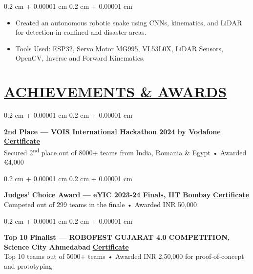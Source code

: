 \documentclass[10pt, letterpaper]{article}
\newenvironment{highlights}{
    \begin{itemize}[
        topsep=0.05 cm,
        parsep=0 cm,
        partopsep=0pt,
        itemsep=0pt,
        leftmargin=0.4 cm + 10pt
    ]
}{
    \end{itemize}
} %
\newenvironment{onecolentry}{
    \begin{adjustwidth}{
        0.2 cm + 0.00001 cm
    }{
        0.2 cm + 0.00001 cm
    }
}{
    \end{adjustwidth}
} %
\begin{document}
\vspace{0.10 cm}
\begin{onecolentry}
    \begin{highlights}
        \item Created an autonomous robotic snake using CNNs, kinematics, and LiDAR for detection in confined and disaster areas.
        \item Tools Used: ESP32, Servo Motor MG995, VL53L0X, LiDAR Sensors, OpenCV, Inverse and Forward Kinematics.
    \end{highlights}
\end{onecolentry}
         

        \section{\href{https://www.harjot.info/\#Achievements}{ACHIEVEMENTS \& AWARDS}}

\begin{onecolentry}
    \textbf{2nd Place --- VOIS International Hackathon 2024 by Vodafone} \hfill
    \href{https://drive.google.com/drive/folders/1iAM-mW90riDdtIffdLflbHKzxa-PJVyi?usp=sharing}{\textbf{Certificate}} \\
    \quad Secured 2\textsuperscript{nd} place out of 8000+ teams from India, Romania \& Egypt • Awarded €4,000
\end{onecolentry}

\vspace{0.04cm}

\begin{onecolentry}
    \textbf{Judges' Choice Award --- eYIC 2023-24 Finals, IIT Bombay} \hfill
    \href{https://drive.google.com/file/d/1oG1jKMsQmqKw4ZLALATirmeHcBpnrcL3/view?usp=sharing}{\textbf{Certificate}} \\
    \quad Competed out of 299 teams in the finale  • Awarded INR 50,000
\end{onecolentry}

\vspace{0.04cm}

\begin{onecolentry}
    \textbf{Top 10 Finalist --- ROBOFEST GUJARAT 4.0 COMPETITION, Science City Ahmedabad} \hfill
    \href{https://drive.google.com/file/d/1z6nXmmgFPRkmLrr91ICkaF7T_WwUkomG/view?usp=sharing}{\textbf{Certificate}} \\
    \quad Top 10 teams out of 5000+ teams  • Awarded INR 2,50,000 for proof-of-concept and prototyping
\end{onecolentry}
\end{document}

